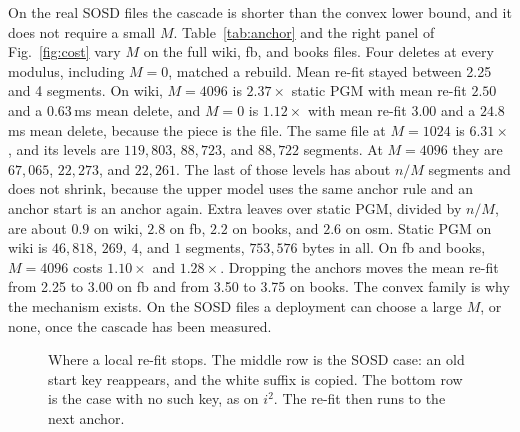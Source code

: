 \documentclass[conference]{IEEEtran}
\begin{document}
On the real SOSD files the cascade is shorter than the convex lower bound, and it does not require a small $M$.
Table~\ref{tab:anchor} and the right panel of Fig.~\ref{fig:cost} vary $M$ on the full wiki, fb, and books files.
Four deletes at every modulus, including $M=0$, matched a rebuild.
Mean re-fit stayed between 2.25 and 4 segments.
On wiki, $M=4096$ is $2.37\times$ static PGM with mean re-fit $2.50$ and a $0.63$\,ms mean delete, and $M=0$ is $1.12\times$ with mean re-fit $3.00$ and a $24.8$\,ms mean delete, because the piece is the file.
The same file at $M=1024$ is $6.31\times$, and its levels are $119{,}803$, $88{,}723$, and $88{,}722$ segments.
At $M=4096$ they are $67{,}065$, $22{,}273$, and $22{,}261$.
The last of those levels has about $n/M$ segments and does not shrink, because the upper model uses the same anchor rule and an anchor start is an anchor again.
Extra leaves over static PGM, divided by $n/M$, are about $0.9$ on wiki, $2.8$ on fb, $2.2$ on books, and $2.6$ on osm.
Static PGM on wiki is $46{,}818$, $269$, $4$, and $1$ segments, $753{,}576$ bytes in all.
On fb and books, $M=4096$ costs $1.10\times$ and $1.28\times$.
Dropping the anchors moves the mean re-fit from 2.25 to 3.00 on fb and from 3.50 to 3.75 on books.
The convex family is why the mechanism exists.
On the SOSD files a deployment can choose a large $M$, or none, once the cascade has been measured.

\begin{figure}[t]
\centering
{}
\caption{Where a local re-fit stops.
The middle row is the SOSD case: an old start key reappears, and the white suffix is copied.
The bottom row is the case with no such key, as on $i^{2}$.
The re-fit then runs to the next anchor.}
\label{fig:cascade}
\end{figure}
\end{document}
